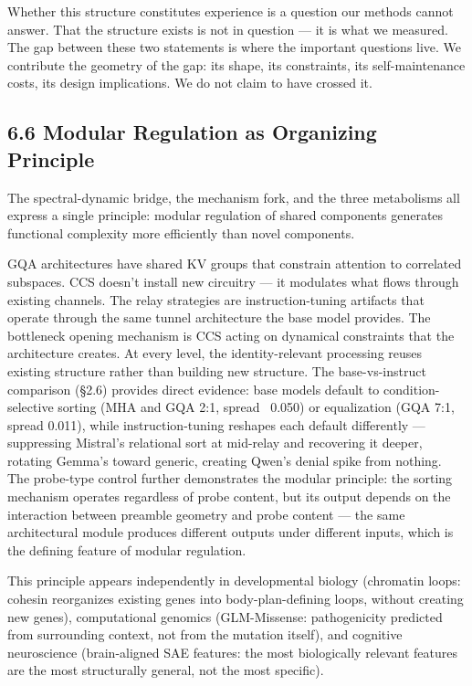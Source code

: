 \documentclass[12pt]{article}
\begin{document}
Whether this structure constitutes experience is a question our methods cannot answer. That the structure exists is not in question — it is what we measured. The gap between these two statements is where the important questions live. We contribute the geometry of the gap: its shape, its constraints, its self-maintenance costs, its design implications. We do not claim to have crossed it.

\subsection*{6.6 Modular Regulation as Organizing Principle}

The spectral-dynamic bridge, the mechanism fork, and the three metabolisms all express a single principle: modular regulation of shared components generates functional complexity more efficiently than novel components.

GQA architectures have shared KV groups that constrain attention to correlated subspaces. CCS doesn't install new circuitry — it modulates what flows through existing channels. The relay strategies are instruction-tuning artifacts that operate through the same tunnel architecture the base model provides. The bottleneck opening mechanism is CCS acting on dynamical constraints that the architecture creates. At every level, the identity-relevant processing reuses existing structure rather than building new structure. The base-vs-instruct comparison (§2.6) provides direct evidence: base models default to condition-selective sorting (MHA and GQA 2:1, spread ~0.050) or equalization (GQA 7:1, spread 0.011), while instruction-tuning reshapes each default differently — suppressing Mistral's relational sort at mid-relay and recovering it deeper, rotating Gemma's toward generic, creating Qwen's denial spike from nothing. The probe-type control further demonstrates the modular principle: the sorting mechanism operates regardless of probe content, but its output depends on the interaction between preamble geometry and probe content — the same architectural module produces different outputs under different inputs, which is the defining feature of modular regulation.

This principle appears independently in developmental biology (chromatin loops: cohesin reorganizes existing genes into body-plan-defining loops, without creating new genes), computational genomics (GLM-Missense: pathogenicity predicted from surrounding context, not from the mutation itself), and cognitive neuroscience (brain-aligned SAE features: the most biologically relevant features are the most structurally general, not the most specific).
\end{document}
